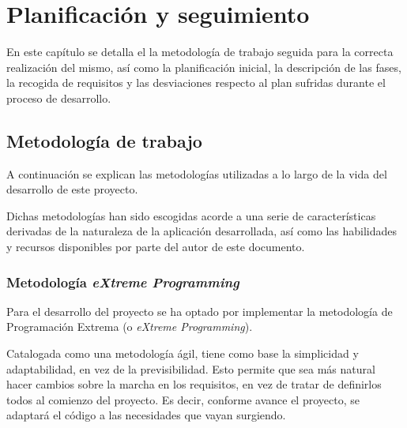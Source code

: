 

\chapter{Planificación y seguimiento} \label{cap:planification}

En este capítulo se detalla el la metodología de trabajo seguida para la correcta realización del mismo, así como la planificación inicial, la descripción de las fases, la recogida de requisitos y las desviaciones respecto al plan sufridas durante el proceso de desarrollo.\n


\section{Metodología de trabajo} \label{sec:methodology}

A continuación se explican las metodologías utilizadas a lo largo de la vida del desarrollo de este proyecto.\sn

Dichas metodologías han sido escogidas acorde a una serie de características derivadas de la naturaleza de la aplicación desarrollada, así como las habilidades y recursos disponibles por parte del autor de este documento.\n

\subsection{Metodología \textit{eXtreme Programming}} \label{sub:methoXP}

Para el desarrollo del proyecto se ha optado por implementar la metodología de Programación Extrema (o \textit{eXtreme Programming}).\sn

Catalogada como una metodología ágil, tiene como base la simplicidad y adaptabilidad, en vez de la previsibilidad. Esto permite que sea más natural hacer cambios sobre la marcha en los requisitos, en vez de tratar de definirlos todos al comienzo del proyecto. Es decir, conforme avance el proyecto, se adaptará el código a las necesidades que vayan surgiendo.\sn


